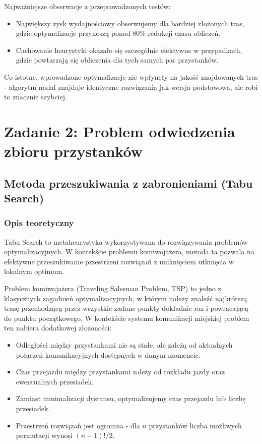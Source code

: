 \documentclass[12pt,a4paper]{article}
\begin{document}
Najważniejsze obserwacje z przeprowadzonych testów:

\begin{itemize}
    \item Największy zysk wydajnościowy obserwujemy dla bardziej złożonych tras, gdzie optymalizacje przynoszą ponad 80\% redukcji czasu obliczeń.
    \item Cachowanie heurystyki okazało się szczególnie efektywne w przypadkach, gdzie powtarzają się obliczenia dla tych samych par przystanków.
\end{itemize}

Co istotne, wprowadzone optymalizacje nie wpłynęły na jakość znajdowanych tras - algorytm nadal znajduje identyczne rozwiązania jak wersja podstawowa, ale robi to znacznie szybciej.

\section{Zadanie 2: Problem odwiedzenia zbioru przystanków}
\subsection{Metoda przeszukiwania z zabronieniami (Tabu Search)}
\subsubsection{Opis teoretyczny}
Tabu Search to metaheurystyka wykorzystywana do rozwiązywania problemów optymalizacyjnych. W kontekście problemu komiwojażera, metoda ta pozwala na efektywne przeszukiwanie przestrzeni rozwiązań z uniknięciem utknięcia w lokalnym optimum.

Problem komiwojażera (Traveling Salesman Problem, TSP) to jedno z klasycznych zagadnień optymalizacyjnych, w którym należy znaleźć najkrótszą trasę przechodzącą przez wszystkie zadane punkty dokładnie raz i powracającą do punktu początkowego. W kontekście systemu komunikacji miejskiej problem ten nabiera dodatkowej złożoności:

\begin{itemize}
    \item Odległości między przystankami nie są stałe, ale zależą od aktualnych połączeń komunikacyjnych dostępnych w danym momencie.
    \item Czas przejazdu między przystankami zależy od rozkładu jazdy oraz ewentualnych przesiadek.
    \item Zamiast minimalizacji dystansu, optymalizujemy czas przejazdu lub liczbę przesiadek.
    \item Przestrzeń rozwiązań jest ogromna - dla $n$ przystanków liczba możliwych permutacji wynosi $(n-1)!/2$.
\end{itemize}
\end{document}
